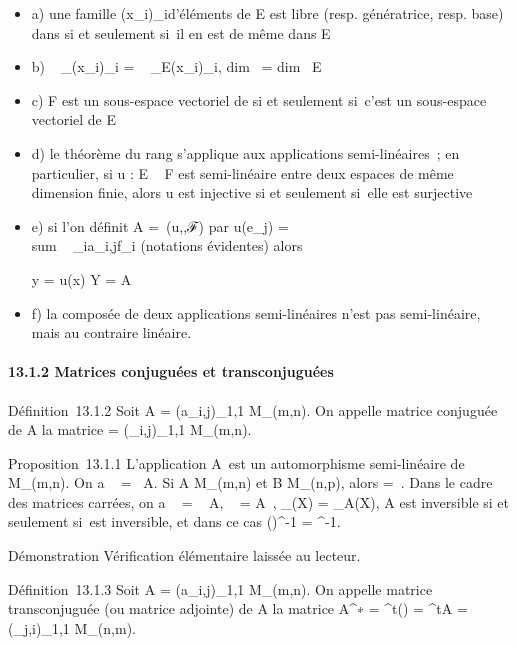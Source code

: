 \documentclass[]{article}
\begin{document}
\begin{itemize}
\item
  a) une famille (x_i)_i\inI d'éléments de E est libre
  (resp. génératrice, resp. base) dans \checkE si et
  seulement si~il en est de même dans E
\item
  b) \mathrmrg~
  _\checkE(x_i)_i\inI
  = \mathrmrg~
  _E(x_i)_i\inI, dim~
  \checkE = dim~ E
\item
  c) F est un sous-espace vectoriel de \checkE si et
  seulement si~c'est un sous-espace vectoriel de E
\item
  d) le théorème du rang s'applique aux applications semi-linéaires~; en
  particulier, si u : E \rightarrow~ F est semi-linéaire entre deux espaces de même
  dimension finie, alors u est injective si et seulement si~elle est
  surjective
\item
  e) si l'on définit A =\
  \mathrmMat (u,,ℱ) par u(e_j)
  = \\sum ~
  _ia_i,jf_i (notations évidentes) alors

  y = u(x) \Leftrightarrow Y =
  A\overlineX
\item
  f) la composée de deux applications semi-linéaires n'est pas
  semi-linéaire, mais au contraire linéaire.
\end{itemize}

\paragraph{13.1.2 Matrices conjuguées et transconjuguées}

Définition~13.1.2 Soit A = (a_i,j)_1\leqi\leqm,1\leqj\leqn \in
M_(m,n). On appelle matrice conjuguée de A la matrice
\overlineA =
(\overlinea_i,j)_1\leqi\leqm,1\leqj\leqn \in
M_(m,n).

Proposition~13.1.1 L'application
A\mapsto~\overlineA est un
automorphisme semi-linéaire de M_(m,n). On a
\mathrmrg\overlineA~
= \mathrmrg~A. Si A \in
M_(m,n) et B \in M_(n,p), alors
\overlineAB =
\overlineA\,\overlineB.
Dans le cadre des matrices carrées, on a
~
\overlineA =
\overline{}~
A,
\overlineA~
=
\overline{}A~,
\chi_\overlineA(X) =
\overline\chi_A(X), A est inversible si et
seulement si~\overlineA est inversible, et dans ce
cas (\overlineA)^-1 =
\overlineA^-1.

Démonstration Vérification élémentaire laissée au lecteur.

Définition~13.1.3 Soit A = (a_i,j)_1\leqi\leqm,1\leqj\leqn \in
M_(m,n). On appelle matrice transconjuguée (ou matrice
adjointe) de A la matrice A^∗ =
^t(\overlineA) =
\overline^tA =
(\overlinea_j,i)_1\leqi\leqm,1\leqj\leqn \in
M_(n,m).
\end{document}

